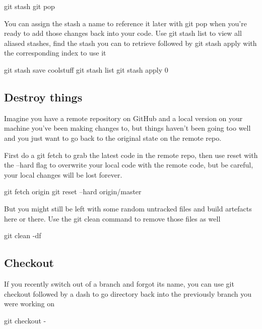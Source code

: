 \begin{console}
    git stash
    git pop
\end{console}

You can assign the stash a name to reference it later with git pop when you're ready to add those changes back into your code. Use git stash list to view all aliased stashes, find the stash you can to retrieve followed by git stash apply with the corresponding index to use it

\begin{console}
    git stash save coolstuff
    git stash list
    git stash apply 0
\end{console}



\subsection{Destroy things}

Imagine you have a remote repository on GitHub and a local version on your machine you've been making changes to, but things haven't been going too well and you just want to go back to the original state on the remote repo.

First do a git fetch to grab the latest code in the remote repo, then use reset with the --hard flag to overwrite your local code with the remote code, but be careful, your local changes will be lost forever.

\begin{console}
    git fetch origin
    git reset --hard origin/master
\end{console}

But you might still be left with some random untracked files and build artefacts here or there. Use the git clean command to remove those files as well

\begin{console}
    git clean -df
\end{console}



\subsection{Checkout}

If you recently switch out of a branch and forgot its name, you can use git checkout followed by a dash to go directory back into the previously branch you were working on

\begin{console}
    git checkout -
\end{console}








